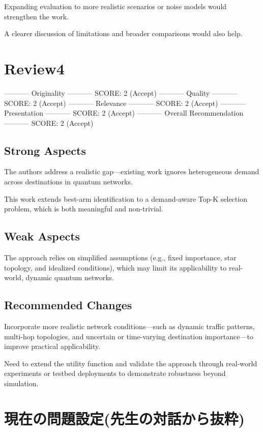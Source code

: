 \documentclass[conference]{IEEEtran}
\begin{document}
Expanding evaluation to more realistic scenarios or noise models would
strengthen the work.

A clearer discussion of limitations and broader comparisons would also
help.


\section{Review4}
\label{sec:org7e735ce}
----------- Originality -----------
SCORE: 2 (Accept)
----------- Quality -----------
SCORE: 2 (Accept)
----------- Relevance -----------
SCORE: 2 (Accept)
----------- Presentation -----------
SCORE: 2 (Accept)
----------- Overall Recommendation -----------
SCORE: 2 (Accept)


\subsection{Strong Aspects}
\label{sec:org1929e5b}
The authors address a realistic gap—existing work ignores
heterogeneous demand across destinations in quantum networks.

This work extends best-arm identification to a demand-aware Top-K
selection problem, which is both meaningful and non-trivial.

\subsection{Weak Aspects}
\label{sec:org295f27b}
The approach relies on simplified assumptions (e.g., fixed importance,
star topology, and idealized conditions), which may limit its
applicability to real-world, dynamic quantum networks.


\subsection{Recommended Changes}
\label{sec:orga03bdd8}
Incorporate more realistic network conditions—such as dynamic traffic
patterns, multi-hop topologies, and uncertain or time-varying
destination importance—to improve practical applicability.

Need to extend the utility function and validate the approach through
real-world experiments or testbed deployments to demonstrate
robustness beyond simulation.

\section{現在の問題設定(先生の対話から抜粋)}
\label{sec:org6e56282}
\end{document}
